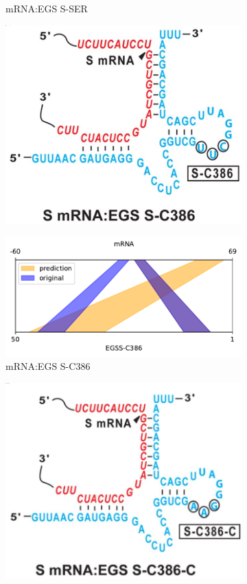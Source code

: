 \documentclass[twoside,a4paper]{report}
\numberwithin{equation}{section}
\begin{document}
\begin{figure}[h!tb]
\begin{subfigure}{.5\textwidth}
			\caption{mRNA:EGS S-SER}
			\label{fig:rricomparison7}
		\end{subfigure}
	 	\begin{subfigure}{.25\textwidth}
	 		\centering
	 		\includegraphics[width=.9\linewidth]{SC386}
	 		\label{fig:SC386}
	 	\end{subfigure}%
 	\begin{subfigure}{.5\textwidth}
 		\centering
 		\includegraphics[width=.9\linewidth]{rricomparison4}
 		\caption{mRNA:EGS S-C386}
 		\label{fig:rricomparison4}
 	\end{subfigure}
	 	\begin{subfigure}{.25\textwidth}
	 		\centering
	 		\includegraphics[width=.9\linewidth]{sc386c}
	 	

\end{subfigure}
\end{figure}
\end{document}
